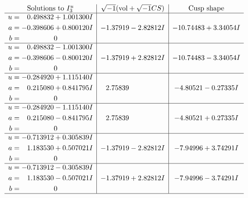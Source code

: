 \documentclass[1p]{elsarticle_modified}
\theoremstyle{definition}
\newcommand{\I}{\sqrt{-1}}
\begin{document}
$$\begin{array}{c|c|c}  
\text{Solutions to }I^u_{3}& \I (\text{vol} + \sqrt{-1}CS) & \text{Cusp shape}\\
 \hline 
\begin{aligned}
u &= \phantom{-}0.498832 + 1.001300 I \\
a &= -0.398606 + 0.800120 I \\
b &= \phantom{-0.000000 } 0\end{aligned}
 & -1.37919 - 2.82812 I & -10.74483 + 3.34054 I \\ \hline\begin{aligned}
u &= \phantom{-}0.498832 - 1.001300 I \\
a &= -0.398606 - 0.800120 I \\
b &= \phantom{-0.000000 } 0\end{aligned}
 & -1.37919 + 2.82812 I & -10.74483 - 3.34054 I \\ \hline\begin{aligned}
u &= -0.284920 + 1.115140 I \\
a &= \phantom{-}0.215080 + 0.841795 I \\
b &= \phantom{-0.000000 } 0\end{aligned}
 & \phantom{-}2.75839\phantom{ +0.000000I} & -4.80521 - 0.27335 I \\ \hline\begin{aligned}
u &= -0.284920 - 1.115140 I \\
a &= \phantom{-}0.215080 - 0.841795 I \\
b &= \phantom{-0.000000 } 0\end{aligned}
 & \phantom{-}2.75839\phantom{ +0.000000I} & -4.80521 + 0.27335 I \\ \hline\begin{aligned}
u &= -0.713912 + 0.305839 I \\
a &= \phantom{-}1.183530 + 0.507021 I \\
b &= \phantom{-0.000000 } 0\end{aligned}
 & -1.37919 - 2.82812 I & -7.94996 + 3.74291 I \\ \hline\begin{aligned}
u &= -0.713912 - 0.305839 I \\
a &= \phantom{-}1.183530 - 0.507021 I \\
b &= \phantom{-0.000000 } 0\end{aligned}
 & -1.37919 + 2.82812 I & -7.94996 - 3.74291 I\\
 \hline 
 \end{array}$$\newpage
\end{document}
